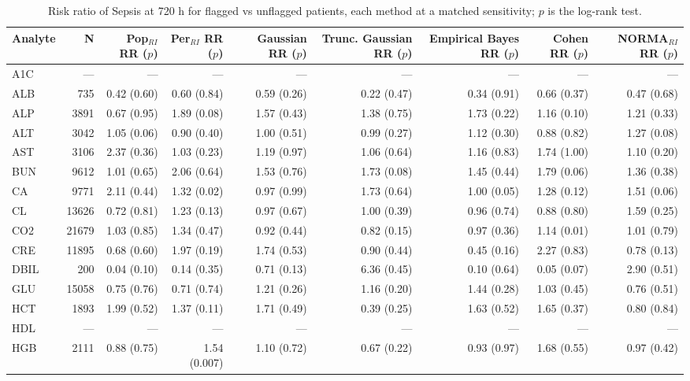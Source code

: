 \begin{table}[ht]
\centering
\footnotesize
\caption{Risk ratio of Sepsis at 720 h for flagged vs unflagged patients, each method at a matched sensitivity; $p$ is the log-rank test.}
\begin{tabular}{lrrrrrrrr}
\toprule
Analyte & N & Pop$_{RI}$ RR ($p$) & Per$_{RI}$ RR ($p$) & Gaussian RR ($p$) & Trunc. Gaussian RR ($p$) & Empirical Bayes RR ($p$) & Cohen RR ($p$) & NORMA$_{RI}$ RR ($p$) \\
\midrule
A1C & --- & --- & --- & --- & --- & --- & --- & --- \\
ALB & 735 & 0.42 (0.60) & 0.60 (0.84) & 0.59 (0.26) & 0.22 (0.47) & 0.34 (0.91) & 0.66 (0.37) & 0.47 (0.68) \\
ALP & 3891 & 0.67 (0.95) & 1.89 (0.08) & 1.57 (0.43) & 1.38 (0.75) & 1.73 (0.22) & 1.16 (0.10) & 1.21 (0.33) \\
ALT & 3042 & 1.05 (0.06) & 0.90 (0.40) & 1.00 (0.51) & 0.99 (0.27) & 1.12 (0.30) & 0.88 (0.82) & 1.27 (0.08) \\
AST & 3106 & 2.37 (0.36) & 1.03 (0.23) & 1.19 (0.97) & 1.06 (0.64) & 1.16 (0.83) & 1.74 (1.00) & 1.10 (0.20) \\
BUN & 9612 & 1.01 (0.65) & 2.06 (0.64) & 1.53 (0.76) & 1.73 (0.08) & 1.45 (0.44) & 1.79 (0.06) & 1.36 (0.38) \\
CA & 9771 & 2.11 (0.44) & 1.32 (0.02) & 0.97 (0.99) & 1.73 (0.64) & 1.00 (0.05) & 1.28 (0.12) & 1.51 (0.06) \\
CL & 13626 & 0.72 (0.81) & 1.23 (0.13) & 0.97 (0.67) & 1.00 (0.39) & 0.96 (0.74) & 0.88 (0.80) & 1.59 (0.25) \\
CO2 & 21679 & 1.03 (0.85) & 1.34 (0.47) & 0.92 (0.44) & 0.82 (0.15) & 0.97 (0.36) & 1.14 (0.01) & 1.01 (0.79) \\
CRE & 11895 & 0.68 (0.60) & 1.97 (0.19) & 1.74 (0.53) & 0.90 (0.44) & 0.45 (0.16) & 2.27 (0.83) & 0.78 (0.13) \\
DBIL & 200 & 0.04 (0.10) & 0.14 (0.35) & 0.71 (0.13) & 6.36 (0.45) & 0.10 (0.64) & 0.05 (0.07) & 2.90 (0.51) \\
GLU & 15058 & 0.75 (0.76) & 0.71 (0.74) & 1.21 (0.26) & 1.16 (0.20) & 1.44 (0.28) & 1.03 (0.45) & 0.76 (0.51) \\
HCT & 1893 & 1.99 (0.52) & 1.37 (0.11) & 1.71 (0.49) & 0.39 (0.25) & 1.63 (0.52) & 1.65 (0.37) & 0.80 (0.84) \\
HDL & --- & --- & --- & --- & --- & --- & --- & --- \\
HGB & 2111 & 0.88 (0.75) & 1.54 (0.007) & 1.10 (0.72) & 0.67 (0.22) & 0.93 (0.97) & 1.68 (0.55) & 0.97 (0.42) \\

\end{tabular}
\end{table}

